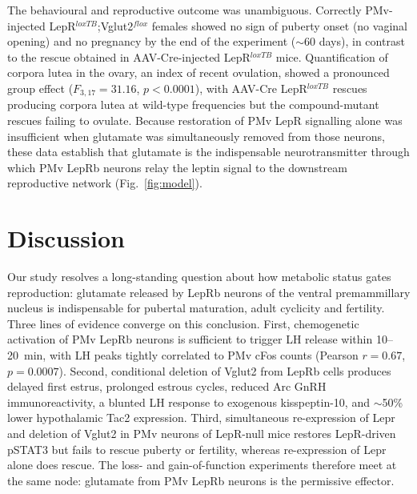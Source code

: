 \documentclass[11pt]{article}
\begin{document}
The behavioural and reproductive outcome was unambiguous. Correctly PMv-injected LepR$^{loxTB}$;Vglut2$^{flox}$ females showed no sign of puberty onset (no vaginal opening) and no pregnancy by the end of the experiment ($\sim$60 days), in contrast to the rescue obtained in AAV-Cre-injected LepR$^{loxTB}$ mice. Quantification of corpora lutea in the ovary, an index of recent ovulation, showed a pronounced group effect ($F_{3,17}=31.16$, $p<0.0001$), with AAV-Cre LepR$^{loxTB}$ rescues producing corpora lutea at wild-type frequencies but the compound-mutant rescues failing to ovulate. Because restoration of PMv LepR signalling alone was insufficient when glutamate was simultaneously removed from those neurons, these data establish that glutamate is the indispensable neurotransmitter through which PMv LepRb neurons relay the leptin signal to the downstream reproductive network (Fig.~\ref{fig:model}).

\section{Discussion}

Our study resolves a long-standing question about how metabolic status gates reproduction: glutamate released by LepRb neurons of the ventral premammillary nucleus is indispensable for pubertal maturation, adult cyclicity and fertility. Three lines of evidence converge on this conclusion. First, chemogenetic activation of PMv LepRb neurons is sufficient to trigger LH release within 10--20~min, with LH peaks tightly correlated to PMv cFos counts (Pearson $r=0.67$, $p=0.0007$). Second, conditional deletion of Vglut2 from LepRb cells produces delayed first estrus, prolonged estrous cycles, reduced Arc GnRH immunoreactivity, a blunted LH response to exogenous kisspeptin-10, and $\sim$50\% lower hypothalamic Tac2 expression. Third, simultaneous re-expression of Lepr and deletion of Vglut2 in PMv neurons of LepR-null mice restores LepR-driven pSTAT3 but fails to rescue puberty or fertility, whereas re-expression of Lepr alone does rescue. The loss- and gain-of-function experiments therefore meet at the same node: glutamate from PMv LepRb neurons is the permissive effector.
\end{document}
